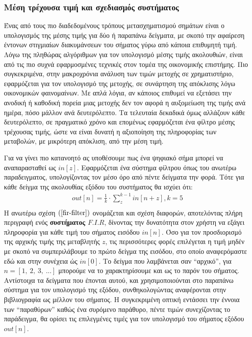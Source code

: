 \documentclass[breaklines=true, 12pt]{article}
\begin{document}
\subsubsection{Μέση τρέχουσα τιμή και σχεδιασμός συστήματος}
\label{sec:orgd8ef167}
Ένας από τους πιο διαδεδομένους τρόπους μετασχηματισμού σημάτων είναι ο υπολογισμός
της μέσης τιμής για δύο ή παραπάνω δείγματα, με σκοπό την αφαίρεση έντονων στιγμιαίων
διακυμάνσεων του σήματος γύρω από κάποια επιθυμητή τιμή. Λόγω της πληθώρας αλγόριθμων
για τον υπολογισμό μέσης τιμής ακολουθιών, είναι από τις πιο συχνά εφαρμοσμένες τεχνικές
στον τομέα της οικονομικής επιστήμης. Πιο συγκεκριμένα, στην μακροχρόνια ανάλυση των
τιμών μετοχής σε χρηματιστήριο, εφαρμόζεται για τον υπολογισμό της μετοχής, σε συνάρτηση
της απόκλισης λόγω οικονομικών φαινομαίνων. Με απλά λόγια, αν κάποιος επιθυμεί να εξετάσει
την ανοδική ή καθοδική πορεία μιας μετοχής δεν τον αφορά η αυξομείωση της τιμής ανά ημέρα,
πόσο μάλλον ανά δευτερόλεπτο. Τα τελευταία δεκαδικά όμως αλλάζουν κάθε δευτερόλεπτο, σε
πραγματικό χρόνο και επομένως εφαρμόζεται ένα φίλτρο μέσης τρέχουσας τιμής,
ώστε να είναι δυνατή η αξιοποίηση της πληροφορίας των μεταβολών, με μικρότερη απόκλιση,
από την μέση τιμή.

Για να γίνει πιο κατανοητό ας υποθέσουμε πως ένα ψηφιακό σήμα μπορεί να αναπαρασταθεί
ως \(in[z]\). Εφαρμόζεται ένα σύστημα φίλτρου όπως του ανωτέρω παραδειγματος, υπολογίζοντας
τον μέσο όρο από πέντε δείγματα την φορά. Τότε για κάθε δείγμα της ακολουθίας εξόδου του
συστήματος θα ισχύει ότι:
\begin{equation}
\label{fir-filter}
\begin{align}
out[n] = \frac{1}{k} \cdot \sum_{z}^{{k-1}}in[n+z], k=5 \\
\end{align}
\end{equation}
Η ανωτέρω σχέση \((\ref{fir-filter})\) ονομάζεται και σχέση διαφορών, αποτελόντας πλήρη περιγραφή ενός \textbf{συστήματος
\(F.I.R\)}, δίνοντας την δυνατότητα στον χρήστη να εξάγει πληροφορία για κάθε τιμή του σήματος
εισόδου \(in[n]\). Όσο για τον προσδιορισμό της αρχικής τιμής της μεταβλητής \(z\), τις περισσότερες
φορές επιλέγεται η τιμή μηδέν με σκοπό να συμπεριλάβουμε το πρώτο δείγμα της εισόδου,
στο οποίο αναφερόμαστε εδώ και στην συνέχεια ώς \(in[0]\). Το δείγμα που λαμβάνεται σαν “αρχικό”,
για \(n = [1,\ 2,\ 3,\ ...]\) μπορούμε να το χαρακτηρίσουμε και ως το παρόν του σήματος. Αντίστοιχα τα
δείγματα που έπονται αυτού, και χρησιμοποιούνται στο παραπάνω σύστημα για τον υπολογισμό
της εξόδου, συνθηκολογώντας αναφέρονται στην βιβλιογραφία ως μέλλον του σήματος. Η
συγκεκριμένη οπτική εντάσσει την έννοια των “παραθύρων” καθώς ένα συρόμενο παράθυρο, πέντε
τιμών συνεχίζοντας το παράδειγμα, θα ορίσει τις επιλεγμένες τιμές για τον υπολογισμό του
σήματος εξόδου \(out[n]\).
\end{document}
